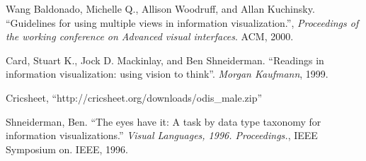 \documentclass[letterpaper, 10 pt, conference]{ieeeconf}  %
\begin{document}
\begin{thebibliography}{99}

 Wang Baldonado, Michelle Q., Allison Woodruff, and Allan Kuchinsky. ``Guidelines for using multiple views in information visualization.'', \emph{Proceedings of the working conference on Advanced visual interfaces}. ACM, 2000.

 Card, Stuart K., Jock D. Mackinlay, and Ben Shneiderman. ``Readings in information visualization: using vision to think''. \emph{Morgan Kaufmann}, 1999.

 Cricsheet, ``http://cricsheet.org/downloads/odis\_male.zip''

 Shneiderman, Ben. ``The eyes have it: A task by data type taxonomy for information visualizations.'' \emph{Visual Languages, 1996. Proceedings.}, IEEE Symposium on. IEEE, 1996.


\end{thebibliography}
\end{document}
